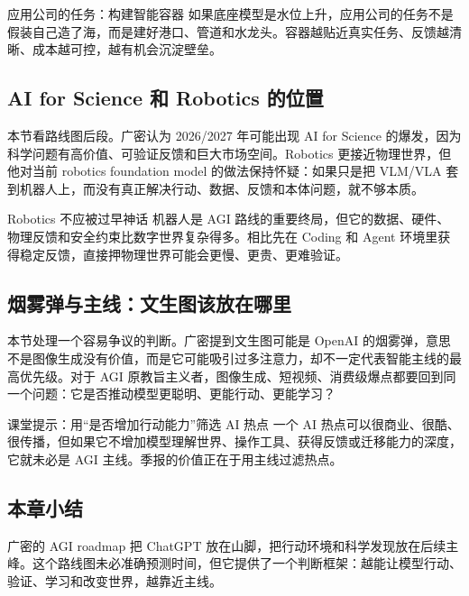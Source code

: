 \documentclass[a4paper]{article}
\begin{document}
\begin{importantbox}{应用公司的任务：构建智能容器}
如果底座模型是水位上升，应用公司的任务不是假装自己造了海，而是建好港口、管道和水龙头。容器越贴近真实任务、反馈越清晰、成本越可控，越有机会沉淀壁垒。
\end{importantbox}

\subsection{AI for Science 和 Robotics 的位置}

本节看路线图后段。广密认为 2026/2027 年可能出现 AI for Science 的爆发，因为科学问题有高价值、可验证反馈和巨大市场空间。Robotics 更接近物理世界，但他对当前 robotics foundation model 的做法保持怀疑：如果只是把 VLM/VLA 套到机器人上，而没有真正解决行动、数据、反馈和本体问题，就不够本质。

\begin{warningbox}{Robotics 不应被过早神话}
机器人是 AGI 路线的重要终局，但它的数据、硬件、物理反馈和安全约束比数字世界复杂得多。相比先在 Coding 和 Agent 环境里获得稳定反馈，直接押物理世界可能会更慢、更贵、更难验证。
\end{warningbox}

\subsection{烟雾弹与主线：文生图该放在哪里}

本节处理一个容易争议的判断。广密提到文生图可能是 OpenAI 的烟雾弹，意思不是图像生成没有价值，而是它可能吸引过多注意力，却不一定代表智能主线的最高优先级。对于 AGI 原教旨主义者，图像生成、短视频、消费级爆点都要回到同一个问题：它是否推动模型更聪明、更能行动、更能学习？

\begin{knowledgebox}{课堂提示：用“是否增加行动能力”筛选 AI 热点}
一个 AI 热点可以很商业、很酷、很传播，但如果它不增加模型理解世界、操作工具、获得反馈或迁移能力的深度，它就未必是 AGI 主线。季报的价值正在于用主线过滤热点。
\end{knowledgebox}

\subsection{本章小结}

广密的 AGI roadmap 把 ChatGPT 放在山脚，把行动环境和科学发现放在后续主峰。这个路线图未必准确预测时间，但它提供了一个判断框架：越能让模型行动、验证、学习和改变世界，越靠近主线。
\end{document}
